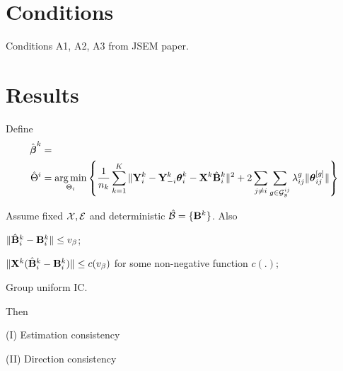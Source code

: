\documentclass[fleqn,11pt]{article}
\DeclareMathOperator*{\argmin}{arg\,min}
\numberwithin{equation}{section}
\begin{document}
\section{Conditions}
Conditions A1, A2, A3 from JSEM paper.

\section{Results}
Define
%
\begin{align}
\hat \bfbeta^k &= \\
\hat \Theta^i &= \argmin_{\Theta_i} \left\{ \frac{1}{n_k} \sum_{k=1}^K \| \bfY^k_i - \bfY_{-i}^k \bftheta_i^k - \bfX^k \hat \bfB_i^k \|^2 + 2 \sum_{j \neq i} \sum_{g \in \cG_y^{ij}} \lambda_{ij}^g \| \bftheta_{ij}^{[g]} \| \right\}
\end{align}

\begin{Theorem}\label{thm:ThetaThm}
Assume fixed ${\cal{X}}, {\cal{E}}$ and deterministic $\hat {{\cal{B}}} = \{ {\mathbf{B}}^k \}$. Also

 $\| \hat {{\mathbf{B}}}_i^k - {\mathbf{B}}_i^k \| \leq v_\beta$;

 $\| {\mathbf{X}}^k (\hat {{\mathbf{B}}}_i^k - {\mathbf{B}}_i^k ) \| \leq c(v_\beta)$ for some non-negative function $c(.)$;

Group uniform IC.

Then

\noindent (I) Estimation consistency

\noindent (II) Direction consistency 
\end{Theorem}
\end{document}
